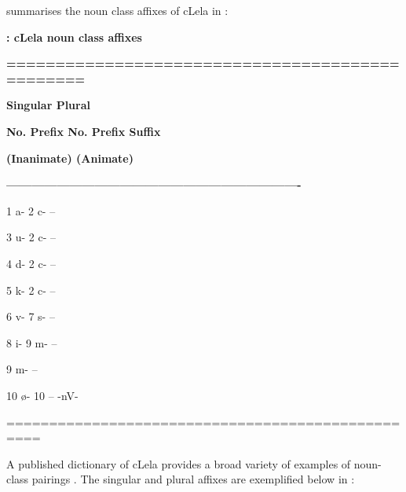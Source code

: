 \documentclass[output=paper]{langsci/langscibook}
\begin{document}
{ summarises the noun class affixes of cLela in \citet{Dettweiler2015}:}



\textbf{{: cLela noun class affixes}}



\textbf{{================================================}}



\textbf{ {Singular            Plural} }



\textbf{{No.  Prefix      No.   Prefix      Suffix}}



\textbf{ {(Inanimate)    (Animate)}}



\textbf{{———————————————————————-}}



{1  a-      2  c-      –}



{3  u-      2  c-      –}



{4  d-      2  c-      –}



{5  k-      2  c-      –}



{6  v-      7  s-      –}



{8  i-      9  m-      –}



{9  m-              –}



{10  ø-      10  –      {}-nV-}



{==================================================}


A published dictionary of cLela provides a broad variety of examples of noun-class pairings \citep{RikotoEtAl2001}. The singular and plural affixes are exemplified below in :
\end{document}
